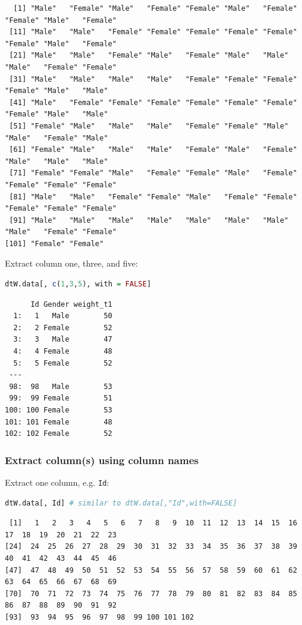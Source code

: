 \documentclass{article}
\begin{document}
\label{}
\begin{verbatim}
  [1] "Male"   "Female" "Male"   "Female" "Female" "Male"   "Female" "Female" "Male"   "Female"
 [11] "Male"   "Male"   "Female" "Female" "Female" "Female" "Female" "Female" "Male"   "Female"
 [21] "Male"   "Male"   "Female" "Male"   "Female" "Male"   "Male"   "Male"   "Female" "Female"
 [31] "Male"   "Male"   "Male"   "Male"   "Female" "Female" "Female" "Female" "Male"   "Male"  
 [41] "Male"   "Female" "Female" "Female" "Female" "Female" "Female" "Female" "Male"   "Male"  
 [51] "Female" "Male"   "Male"   "Male"   "Female" "Female" "Male"   "Male"   "Female" "Male"  
 [61] "Female" "Male"   "Male"   "Male"   "Female" "Male"   "Female" "Male"   "Male"   "Male"  
 [71] "Female" "Female" "Male"   "Female" "Female" "Male"   "Female" "Female" "Female" "Female"
 [81] "Male"   "Male"   "Female" "Female" "Male"   "Female" "Female" "Female" "Female" "Female"
 [91] "Male"   "Male"   "Male"   "Male"   "Male"   "Male"   "Male"   "Male"   "Female" "Female"
[101] "Female" "Female"
\end{verbatim}

Extract column one, three, and five:
\begin{lstlisting}[language=r,numbers=none]
dtW.data[, c(1,3,5), with = FALSE]
\end{lstlisting}

\label{}
\begin{verbatim}
      Id Gender weight_t1
  1:   1   Male        50
  2:   2 Female        52
  3:   3   Male        47
  4:   4 Female        48
  5:   5 Female        52
 ---                     
 98:  98   Male        53
 99:  99 Female        51
100: 100 Female        53
101: 101 Female        48
102: 102 Female        52
\end{verbatim}
\subsubsection{Extract column(s) using column names}
\label{sec:orge5e444f}

Extract one column, e.g. \texttt{Id}:
\begin{lstlisting}[language=r,numbers=none]
dtW.data[, Id] # similar to dtW.data[,"Id",with=FALSE] 
\end{lstlisting}

\label{}
\begin{verbatim}
 [1]   1   2   3   4   5   6   7   8   9  10  11  12  13  14  15  16  17  18  19  20  21  22  23
[24]  24  25  26  27  28  29  30  31  32  33  34  35  36  37  38  39  40  41  42  43  44  45  46
[47]  47  48  49  50  51  52  53  54  55  56  57  58  59  60  61  62  63  64  65  66  67  68  69
[70]  70  71  72  73  74  75  76  77  78  79  80  81  82  83  84  85  86  87  88  89  90  91  92
[93]  93  94  95  96  97  98  99 100 101 102
\end{verbatim}
\end{document}
